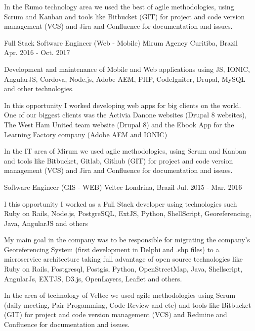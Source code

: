 \begin{cventries}
{\begin{cvitems}
        \item {In the Rumo technology area we used the best of agile methodologies, using Scrum and Kanban and tools like Bitbucket (GIT) for project and code version management (VCS) and Jira and Confluence for documentation and issues.}
      \end{cvitems}
    }
  \cventry
    {Full Stack Software Engineer (Web - Mobile)} %
    {Mirum Agency} %
    {Curitiba, Brazil} %
    {Apr. 2016 - Oct. 2017} %
    {
      \begin{cvitems} %
        \item {Development and maintenance of Mobile and Web applications using JS, IONIC, AngularJS, Cordova, Node.js, Adobe AEM, PHP, CodeIgniter, Drupal, MySQL and other technologies.}
        \item {In this opportunity I worked developing web apps for big clients on the world. One of our biggest clients was the Activia Danone websites (Drupal 8 websites), The West Ham United team website (Drupal 8) and the Ebook App for the Learning Factory company (Adobe AEM and IONIC) }
\item {In the IT area of Mirum we used agile methodologies, using Scrum and Kanban and tools like Bitbucket, Gitlab, Github (GIT) for project and code version management (VCS) and Jira and Confluence for documentation and issues.}
\end{cvitems}
    }

  \cventry
    {Software Engineer (GIS - WEB)} %
    {Veltec} %
    {Londrina, Brazil} %
    {Jul. 2015 - Mar. 2016} %
    {
      \begin{cvitems} %
        \item { I this opportunity I worked as a Full Stack developer using technologies such Ruby on Rails, Node.js, PostgreSQL, ExtJS, Python, ShellScript, Georeferencing, Java, AngularJS and others}
\item {My main goal in the company was to be responsible for migrating the company's Georeferencing System (first development in Delphi and .shp files) to a microservice architecture taking full advantage of open source technologies like Ruby on Rails, Postgresql, Postgis, Python, OpenStreetMap, Java, Shellscript, AngularJs, EXTJS, D3.js, OpenLayers, Leaflet and others.}
\item {In the area of technology of Veltec we used agile methodologies using Scrum (daily meeting, Pair Progamming, Code Review and etc) and tools like Bitbucket (GIT) for project and code version management (VCS) and Redmine and Confluence for documentation and issues.}
      \end{cvitems}
    }


\end{cventries}
